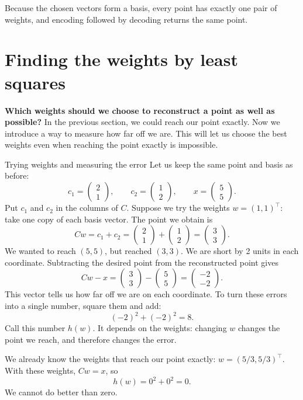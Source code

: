 \documentclass[a4paper,12pt,oneside]{report}
\begin{document}
Because the chosen vectors form a basis, every point has exactly one
pair of weights, and encoding followed by decoding returns the same
point.

\section{Finding the weights by least squares}

\textbf{Which weights should we choose to reconstruct a point as well
as possible?} In the previous section, we could reach our point
exactly. Now we introduce a way to measure how far off we are.
This will let us choose the best weights even when reaching the
point exactly is impossible.

\begin{framedexample}{Trying weights and measuring the error}
Let us keep the same point and basis as before:
\[
  c_1=\begin{pmatrix}2\\1\end{pmatrix},\qquad
  c_2=\begin{pmatrix}1\\2\end{pmatrix},\qquad
  x=\begin{pmatrix}5\\5\end{pmatrix}.
\]
Put $c_1$ and $c_2$ in the columns of $C$.
Suppose we try the weights $w=(1,1)^\top$: take one copy of each
basis vector. The point we obtain is
\[
  Cw=c_1+c_2
     =\begin{pmatrix}2\\1\end{pmatrix}
      +\begin{pmatrix}1\\2\end{pmatrix}
     =\begin{pmatrix}3\\3\end{pmatrix}.
\]
We wanted to reach $(5,5)$, but reached $(3,3)$.
We are short by 2 units in each coordinate. Subtracting the desired
point from the reconstructed point gives
\[
  Cw-x=\begin{pmatrix}3\\3\end{pmatrix}
       -\begin{pmatrix}5\\5\end{pmatrix}
       =\begin{pmatrix}-2\\-2\end{pmatrix}.
\]
This vector tells us how far off we are on each coordinate.
To turn these errors into a single number, square them and add:
\[
  (-2)^2+(-2)^2=8.
\]
Call this number $h(w)$. It depends on the weights: changing $w$
changes the point we reach, and therefore changes the error.

We already know the weights that reach our point exactly:
$w=(5/3,5/3)^\top$. With these weights, $Cw=x$, so
\[
  h(w)=0^2+0^2=0.
\]
We cannot do better than zero.
\end{framedexample}
\end{document}
